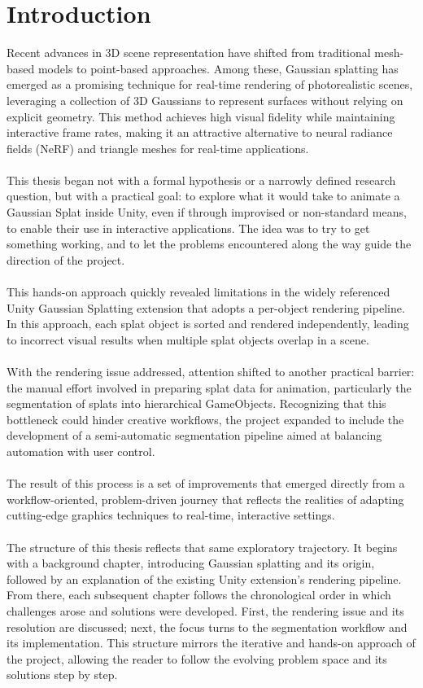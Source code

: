 \documentclass[12pt]{article}
\begin{document}
\section{Introduction}
Recent advances in 3D scene representation have shifted from traditional mesh-based models to point-based approaches. Among these, Gaussian splatting \parencite{OriginalSplatting} has emerged as a promising technique for real-time rendering of photorealistic scenes, leveraging a collection of 3D Gaussians to represent surfaces without relying on explicit geometry. This method achieves high visual fidelity while maintaining interactive frame rates, making it an attractive alternative to neural radiance fields (NeRF) and triangle meshes for real-time applications.
\\\\
This thesis began not with a formal hypothesis or a narrowly defined research question, but with a practical goal: to explore what it would take to animate a Gaussian Splat inside Unity, even if through improvised or non-standard means, to enable their use in interactive applications. The idea was to try to get something working, and to let the problems encountered along the way guide the direction of the project.
\\\\
This hands-on approach quickly revealed limitations in the widely referenced Unity Gaussian Splatting extension \parencite{Aras} that adopts a per-object rendering pipeline. In this approach, each splat object is sorted and rendered independently, leading to incorrect visual results when multiple splat objects overlap in a scene.
\\\\
With the rendering issue addressed, attention shifted to another practical barrier: the manual effort involved in preparing splat data for animation, particularly the segmentation of splats into hierarchical GameObjects. Recognizing that this bottleneck could hinder creative workflows, the project expanded to include the development of a semi-automatic segmentation pipeline aimed at balancing automation with user control.
\\\\
The result of this process is a set of improvements that emerged directly from a workflow-oriented, problem-driven journey that reflects the realities of adapting cutting-edge graphics techniques to real-time, interactive settings.
\\\\
The structure of this thesis reflects that same exploratory trajectory. It begins with a background chapter, introducing Gaussian splatting and its origin, followed by an explanation of the existing Unity extension’s rendering pipeline. From there, each subsequent chapter follows the chronological order in which challenges arose and solutions were developed. First, the rendering issue and its resolution are discussed; next, the focus turns to the segmentation workflow and its implementation. This structure mirrors the iterative and hands-on approach of the project, allowing the reader to follow the evolving problem space and its solutions step by step.
\end{document}
